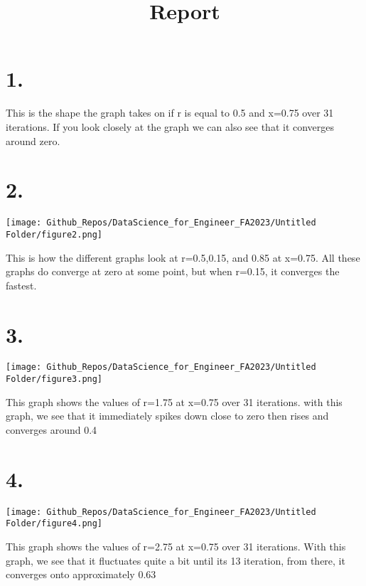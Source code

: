\documentclass[
  letterpaper,
  DIV=11,
  numbers=noendperiod]{scrartcl}
\title{Report}
\author{}
\date{}
\begin{document}
\maketitle
\ifdefined\Shaded\renewenvironment{Shaded}{\begin{tcolorbox}[boxrule=0pt, sharp corners, interior hidden, frame hidden, borderline west={3pt}{0pt}{shadecolor}, enhanced, breakable]}{\end{tcolorbox}}\fi

\hypertarget{section}{%
\section{1.}\label{section}}

This is the shape the graph takes on if r is equal to 0.5 and x=0.75
over 31 iterations. If you look closely at the graph we can also see
that it converges around zero.

\hypertarget{section-1}{%
\section{2.}\label{section-1}}

\texttt{[image: Github\_Repos/DataScience\_for\_Engineer\_FA2023/Untitled Folder/figure2.png]}

This is how the different graphs look at r=0.5,0.15, and 0.85 at x=0.75.
All these graphs do converge at zero at some point, but when r=0.15, it
converges the fastest.

\hypertarget{section-2}{%
\section{3.}\label{section-2}}

\texttt{[image: Github\_Repos/DataScience\_for\_Engineer\_FA2023/Untitled Folder/figure3.png]}

This graph shows the values of r=1.75 at x=0.75 over 31 iterations. with
this graph, we see that it immediately spikes down close to zero then
rises and converges around 0.4

\hypertarget{section-3}{%
\section{4.}\label{section-3}}

\texttt{[image: Github\_Repos/DataScience\_for\_Engineer\_FA2023/Untitled Folder/figure4.png]}

This graph shows the values of r=2.75 at x=0.75 over 31 iterations. With
this graph, we see that it fluctuates quite a bit until its 13
iteration, from there, it converges onto approximately 0.63
\end{document}
